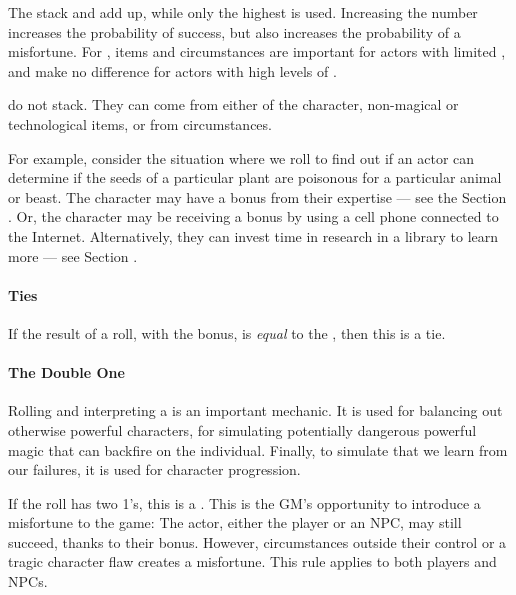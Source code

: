 \begin{emphasisParagraph}
	The  stack and add up, while only the highest  is used.
	Increasing the number  increases the probability of success, but
	also increases the probability of a misfortune. For ,
	items and circumstances are important for actors with limited ,
	and make no difference for actors with high levels of .
\end{emphasisParagraph}


 do not stack.
They can come from either  of the character,
non-magical or technological items, or from circumstances.

For example, consider the situation where we roll to find out if
an actor can determine if the seeds of a particular plant are
poisonous for a particular animal or beast. The character may have a
bonus from their expertise --- see the Section .
Or, the character may be receiving a bonus by using a cell phone connected to the Internet.
Alternatively, they can invest time in research in a library to learn more
--- see Section .




\paragraph*{Ties}
If the result of a roll, with the bonus, is \emph{equal} to the \acronymDL,
then this is a tie.

\paragraph*{The Double One}

Rolling and interpreting a  is an important
mechanic. It is used for balancing out otherwise powerful
characters, for simulating potentially dangerous powerful magic
that can backfire on the individual. Finally, to simulate
that we learn from our failures, it is used for character
progression.

If the roll has two 1's, this is a .
This is the GM's opportunity to introduce a misfortune to the game:
The actor, either the player or an NPC, may still succeed, thanks to their bonus.
However, circumstances outside their control or a tragic character flaw creates a misfortune.
This rule applies to both players and NPCs.

